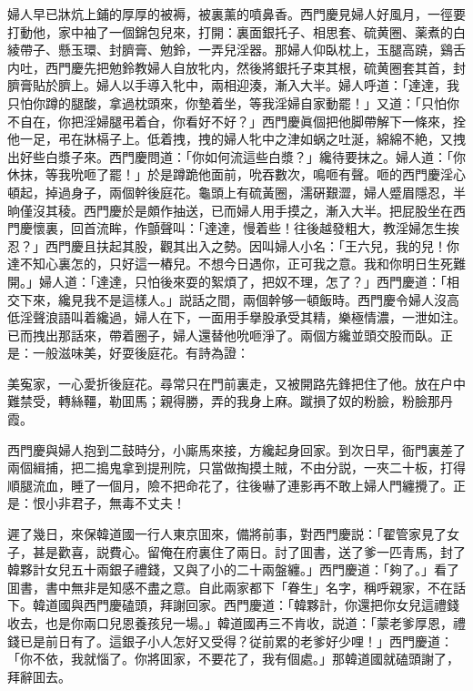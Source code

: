 婦人早已牀炕上鋪的厚厚的被褥，被裏薰的噴鼻香。西門慶見婦人好風月，一徑要打動他，家中袖了一個錦包兒來，打開：裏面銀托子、相思套、硫黄圈、薬煮的白綾帶子、懸玉環、封臍膏、勉鈴，一弄兒淫器。那婦人仰臥枕上，玉腿高蹺，鷄舌内吐，西門慶先把勉鈴教婦人自放牝内，然後將銀托子束其根，硫黄圈套其首，封臍膏貼於臍上。婦人以手導入牝中，兩相迎湊，漸入大半。婦人呼道：「達達，我只怕你蹲的腿酸，拿過枕頭來，你墊着坐，等我淫婦自家動罷！」又道：「只怕你不自在，你把淫婦腿弔着㒲，你看好不好？」西門慶眞個把他脚帶解下一條來，拴他一足，弔在牀槅子上。低着拽，拽的婦人牝中之津如蜗之吐涎，綿綿不絶，又拽出好些白漿子來。西門慶問道：「你如何流這些白漿？」纔待要抹之。婦人道：「你休抹，等我吮咂了罷！」於是蹲跪他面前，吮吞數次，鳴咂有聲。咂的西門慶淫心頓起，掉過身子，兩個幹後庭花。龜頭上有硫黃圈，濡硏艱澀，婦人蹙眉隱忍，半晌僅沒其稜。西門慶於是頗作抽送，已而婦人用手摸之，漸入大半。把屁股坐在西門慶懷裏，回首流眸，作顫聲叫：「達達，慢着些！往後越發粗大，教淫婦怎生挨忍？」西門慶且扶起其股，觀其出入之勢。因叫婦人小名：「王六兒，我的兒！你達不知心裏怎的，只好這一樁兒。不想今日遇你，正可我之意。我和你明日生死難開。」婦人道：「達達，只怕後來耍的絮煩了，把奴不理，怎了？」西門慶道：「相交下來，纔見我不是這樣人。」説話之間，兩個幹够一頓飯時。西門慶令婦人沒高低淫聲浪語叫着纔過，婦人在下，一面用手擧股承受其精，樂極情濃，一泄如注。已而拽出那話來，帶着圈子，婦人還替他吮咂淨了。兩個方纔並頭交股而臥。正是：一般滋味美，好耍後庭花。有詩為證：

美寃家，一心愛折後庭花。尋常只在門前裏走，又被開路先鋒把住了他。放在户中難禁受，轉絲韁，勒囬馬；親得勝，弄的我身上麻。蹴損了奴的粉臉，粉臉那丹霞。

西門慶與婦人抱到二鼓時分，小廝馬來接，方纔起身回家。到次日早，衙門裏差了兩個緝捕，把二搗鬼拿到提刑院，只當做掏摸土賊，不由分説，一夾二十板，打得順腿流血，睡了一個月，險不把命花了，往後嚇了連影再不敢上婦人門纏攪了。正是：恨小非君子，無毒不丈夫！

遲了幾日，來保韓道國一行人東京囬來，備將前事，對西門慶説：「翟管家見了女子，甚是歡喜，説費心。留俺在府裏住了兩日。討了囬書，送了爹一匹青馬，封了韓夥計女兒五十兩銀子禮錢，又與了小的二十兩盤纏。」西門慶道：「夠了。」看了囬書，書中無非是知感不盡之意。自此兩家都下「眷生」名字，稱呼親家，不在話下。韓道國與西門慶磕頭，拜謝回家。西門慶道：「韓夥計，你還把你女兒這禮錢收去，也是你兩口兒恩養孩兒一場。」韓道國再三不肯收，説道：「蒙老爹厚恩，禮錢已是前日有了。這銀子小人怎好又受得？従前累的老爹好少哩！」西門慶道：「你不依，我就惱了。你將囬家，不要花了，我有個處。」那韓道國就磕頭謝了，拜辭囬去。

